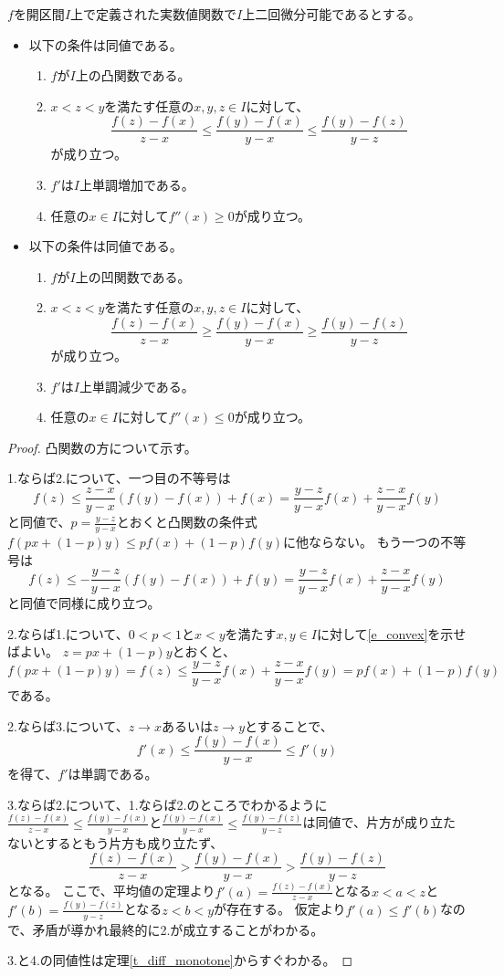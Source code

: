 \begin{proposition}[凸関数と二階微分]
$f$を開区間$I$上で定義された実数値関数で$I$上二回微分可能であるとする。
\begin{itemize}
\item
以下の条件は同値である。
\begin{enumerate}
\item
$f$が$I$上の凸関数である。
\item
$x < z < y$を満たす任意の$x, y, z \in I$に対して、
$$
\frac{f(z)-f(x)}{z-x} \le \frac{f(y)-f(x)}{y-x} \le \frac{f(y)-f(z)}{y-z}
$$
が成り立つ。
\item
$f'$は$I$上単調増加である。
\item
任意の$x \in I$に対して$f''(x) \ge 0$が成り立つ。
\end{enumerate}
\item
以下の条件は同値である。
\begin{enumerate}
\item
$f$が$I$上の凹関数である。
\item
$x < z < y$を満たす任意の$x, y, z \in I$に対して、
$$
\frac{f(z)-f(x)}{z-x} \ge \frac{f(y)-f(x)}{y-x} \ge \frac{f(y)-f(z)}{y-z}
$$
が成り立つ。
\item
$f'$は$I$上単調減少である。
\item
任意の$x \in I$に対して$f''(x) \le 0$が成り立つ。
\end{enumerate}
\end{itemize}
\end{proposition}

\begin{proof}
凸関数の方について示す。

1.ならば2.について、一つ目の不等号は
$$
f(z) \le \frac{z-x}{y-x}(f(y)-f(x))+f(x) = \frac{y-z}{y-x}f(x)+\frac{z-x}{y-x}f(y)
$$
と同値で、$p = \frac{y-z}{y-x}$とおくと凸関数の条件式$f(p x+(1-p)y) \le p f(x)+(1-p)f(y)$に他ならない。
もう一つの不等号は
$$
f(z) \le -\frac{y-z}{y-x}(f(y)-f(x))+f(y) = \frac{y-z}{y-x}f(x)+\frac{z-x}{y-x}f(y)
$$
と同値で同様に成り立つ。

2.ならば1.について、$0 < p < 1$と$x < y$を満たす$x, y \in I$に対して\eqref{e_convex}を示せばよい。
$z = p x+(1-p)y$とおくと、
$$
f(p x+(1-p)y) = f(z) \le \frac{y-z}{y-x}f(x)+\frac{z-x}{y-x}f(y) = p f(x)+(1-p)f(y)
$$
である。

2.ならば3.について、$z \to x$あるいは$z \to y$とすることで、
$$
f'(x) \le \frac{f(y)-f(x)}{y-x} \le f'(y)
$$
を得て、$f'$は単調である。

3.ならば2.について、1.ならば2.のところでわかるように$\frac{f(z)-f(x)}{z-x} \le \frac{f(y)-f(x)}{y-x}$と$\frac{f(y)-f(x)}{y-x} \le \frac{f(y)-f(z)}{y-z}$は同値で、片方が成り立たないとするともう片方も成り立たず、
$$
\frac{f(z)-f(x)}{z-x} > \frac{f(y)-f(x)}{y-x} > \frac{f(y)-f(z)}{y-z}
$$
となる。
ここで、平均値の定理より$f'(a) = \frac{f(z)-f(x)}{z-x}$となる$x < a < z$と$f'(b) = \frac{f(y)-f(z)}{y-z}$となる$z < b < y$が存在する。
仮定より$f'(a) \le f'(b)$なので、矛盾が導かれ最終的に2.が成立することがわかる。

3.と4.の同値性は定理\ref{t_diff_monotone}からすぐわかる。
\end{proof}

